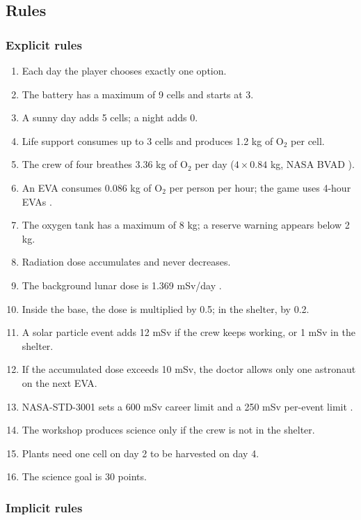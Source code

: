 \documentclass[11pt,a4paper]{article}
\begin{document}
\subsection{Rules}

\subsubsection*{Explicit rules}

\begin{enumerate}
  \item Each day the player chooses exactly one option.
  \item The battery has a maximum of 9 cells and starts at 3.
  \item A sunny day adds 5 cells; a night adds 0.
  \item Life support consumes up to 3 cells and produces 1.2 kg of O$_2$ per cell.
  \item The crew of four breathes 3.36 kg of O$_2$ per day ($4 \times 0.84$ kg, NASA BVAD \cite{bvad}).
  \item An EVA consumes 0.086 kg of O$_2$ per person per hour; the game uses 4-hour EVAs \cite{bvad}.
  \item The oxygen tank has a maximum of 8 kg; a reserve warning appears below 2 kg.
  \item Radiation dose accumulates and never decreases.
  \item The background lunar dose is 1.369 mSv/day \cite{zhang2020}.
  \item Inside the base, the dose is multiplied by 0.5; in the shelter, by 0.2.
  \item A solar particle event adds 12 mSv if the crew keeps working, or 1 mSv in the shelter.
  \item If the accumulated dose exceeds 10 mSv, the doctor allows only one astronaut on the next EVA.
  \item NASA-STD-3001 sets a 600 mSv career limit and a 250 mSv per-event limit \cite{nasa3001}.
  \item The workshop produces science only if the crew is not in the shelter.
  \item Plants need one cell on day 2 to be harvested on day 4.
  \item The science goal is 30 points.
\end{enumerate}

\subsubsection*{Implicit rules}
\end{document}
